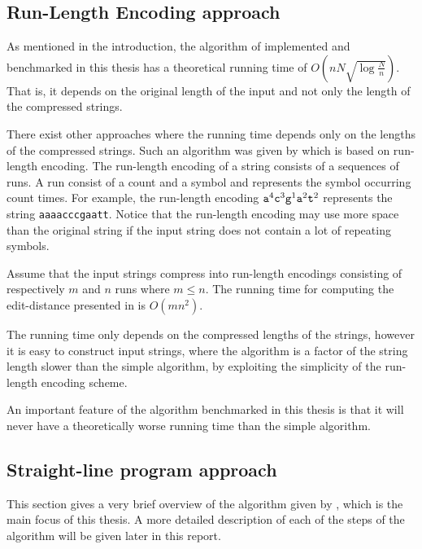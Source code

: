 \documentclass[twoside,11pt,openright]{report}
\begin{document}
\subsection{Run-Length Encoding approach}
As mentioned in the introduction, the algorithm of \cite{Gawrychowski:2012:FAC:2422024.2422048} implemented and benchmarked in this thesis has a theoretical running time of $O(n N \sqrt{\log{\frac{N}{n}}})$. That is, it depends on the original length of the input and not only the length of the compressed strings.

There exist other approaches where the running time depends only on the lengths of the compressed strings. Such an algorithm was given by \cite{Chen:2010:FCA:1888935.1888984} which is based on run-length encoding. The run-length encoding of a string consists of a sequences of runs. A run consist of a count and a symbol and represents the symbol occurring count times. For example, the run-length encoding $\text{\texttt{a}}^4\text{\texttt{c}}^3\text{\texttt{g}}^1\text{\texttt{a}}^2\text{\texttt{t}}^2$ represents the string \texttt{aaaacccgaatt}. Notice that the run-length encoding may use more space than the original string if the input string does not contain a lot of repeating symbols. 

Assume that the input strings compress into run-length encodings consisting of respectively $m$ and $n$ runs where $m \leq n$. The running time for computing the edit-distance presented in \cite{Chen:2010:FCA:1888935.1888984} is $O(mn^2)$.

The running time only depends on the compressed lengths of the strings, however it is easy to construct input strings, where the algorithm is a factor of the string length slower than the simple algorithm, by exploiting the simplicity of the run-length encoding scheme.

An important feature of the algorithm benchmarked in this thesis is that it will never have a theoretically worse running time than the simple algorithm.

\subsection{Straight-line program approach}
\label{sec:edit-dist-on-slps-steps}
This section gives a very brief overview of the algorithm given by \cite{Gawrychowski:2012:FAC:2422024.2422048}, which is the main focus of this thesis. A more detailed description of each of the steps of the algorithm will be given later in this report. 
\end{document}
